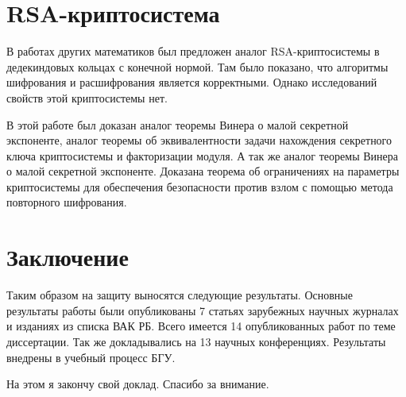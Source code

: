 \documentclass[12pt]{article}
\begin{document}
\section{RSA-криптосистема}

В работах других математиков был предложен аналог RSA-криптосистемы в дедекиндовых кольцах с конечной нормой.
Там было показано, что алгоритмы шифрования и расшифрования является корректными.
Однако исследований свойств этой криптосистемы нет.

В этой работе был доказан аналог теоремы Винера о малой секретной экспоненте, аналог теоремы об эквивалентности задачи нахождения секретного ключа криптосистемы и факторизации модуля.
А так же аналог теоремы Винера о малой секретной экспоненте.
Доказана теорема об ограничениях на параметры криптосистемы для обеспечения безопасности против взлом с помощью метода повторного шифрования.

\section{Заключение}

Таким образом на защиту выносятся следующие результаты.
Основные результаты работы были опубликованы 7 статьях зарубежных научных журналах и изданиях из списка ВАК РБ.
Всего имеется 14 опубликованных работ по теме диссертации.
Так же докладывались на 13 научных конференциях.
Результаты внедрены в учебный процесс БГУ.

На этом я закончу свой доклад.
Спасибо за внимание.
\end{document}
